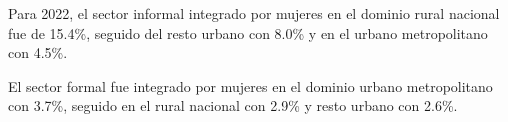 Para 2022, el  sector informal integrado por mujeres en el dominio rural nacional fue de 15.4\%, seguido del resto urbano con 8.0\% y en el urbano metropolitano con 4.5\%. 

El sector formal fue integrado por mujeres en el dominio urbano metropolitano con 3.7\%, seguido en el rural nacional con 2.9\% y resto urbano con 2.6\%.